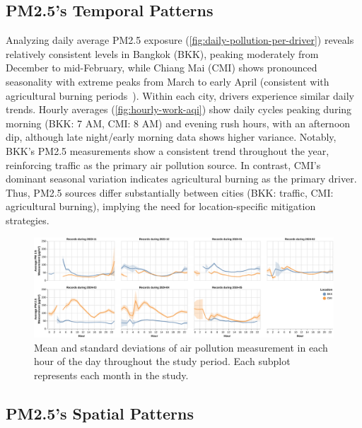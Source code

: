 \documentclass[sigconf,screen,natbib=true]{acmart}
\begin{document}
\subsection{PM2.5's Temporal Patterns}
Analyzing daily average PM2.5 exposure (\autoref{fig:daily-pollution-per-driver}) reveals relatively consistent levels in Bangkok (BKK), peaking moderately from December to mid-February,
while Chiang Mai (CMI) shows pronounced seasonality with extreme peaks from March to early April (consistent with agricultural burning periods~\cite{david2025chiangmaiburn, bernsten2024chiangmaiburn, iqair2023chiangmaiburn}).
Within each city, drivers experience similar daily trends.
Hourly averages (\autoref{fig:hourly-work-aqi}) show daily cycles peaking during morning (BKK: 7 AM, CMI: 8 AM) and evening rush hours, with an afternoon dip, although late night/early morning data shows higher variance.
Notably, BKK's PM2.5 measurements show a consistent trend throughout the year, reinforcing traffic as the primary air pollution source.
In contrast, CMI's dominant seasonal variation indicates agricultural burning as the primary driver.
Thus, PM2.5 sources differ substantially between cities (BKK: traffic, CMI: agricultural burning), implying the need for location-specific mitigation strategies.





\begin{figure}
    \centering
    \includegraphics[width=\textwidth]{figures/average-hourly-pollution.pdf}\caption{Mean and standard deviations of air pollution measurement in each hour of the day throughout the study period.
Each subplot represents each month in the study. }\Description{}
    \label{fig:hourly-work-aqi}\end{figure}





\subsection{PM2.5's Spatial Patterns}
\end{document}

